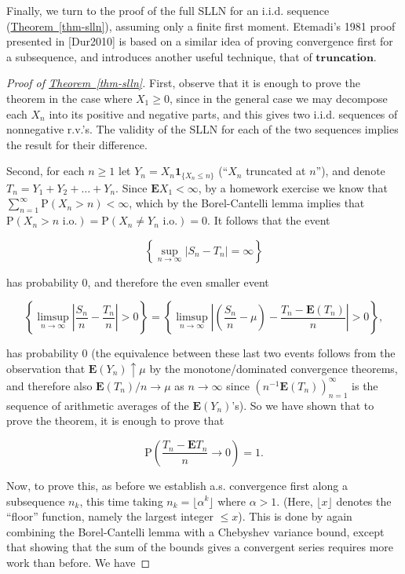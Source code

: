 \documentclass[11pt]{report}
\theoremstyle{plain}
\theoremstyle{definition}
\begin{document}
\noindent Finally, we turn to the proof of the full SLLN for an
i.i.d. sequence (\hyperref[thm-slln]{Theorem~\ref*{thm-slln}}), assuming only a
finite first moment. Etemadi's 1981 proof presented in
[Dur2010] is based on a similar idea of proving
convergence first for a subsequence, and introduces
another useful technique, that of
$\textbf{truncation}$.

\begin{proof}[Proof of \texorpdfstring{\hyperref[thm-slln]{Theorem~\ref*{thm-slln}}}{Theorem}]
First, observe that it is enough to prove the theorem
in the case where $X_1\ge 0$, since in the general
case we may decompose each $X_n$ into its positive
and negative parts, and this gives two i.i.d.
sequences of nonnegative r.v.'s. The validity of the
SLLN for each of the two sequences implies the result
for their difference.

Second, for each $n\ge 1$ let
$Y_n = X_n \mathbf{1}_{\{X_n\le n\}}$ (``$X_n$
truncated at $n$''), and denote
$T_n=Y_1+Y_2+\ldots +Y_n$. Since
$\mathbf{E} X_1<\infty$, by a homework exercise we
know that
$\sum_{n=1}^\infty \mathrm{P}(X_n> n)<\infty$, which
by the Borel-Cantelli lemma implies that
$\mathrm{P}(X_n>n\textrm{ i.o.}) = \mathrm{P}(X_n\neq
Y_n\textrm{ i.o.}) = 0$.
It follows that the event

\[
\left\{ \sup_{n\to\infty} |S_n-T_n|=\infty \right\}
\]

\noindent has probability 0, and therefore the even smaller
event

\[
\left\{ \limsup_{n\to\infty} \left|\frac{S_n}{n}-\frac{T_n}{n} \right|>0 \right\}=
\left\{ \limsup_{n\to\infty} \left|\left(\frac{S_n}{n}-\mu\right)-\frac{T_n-\mathbf{E}(T_n)}{n} \right|>0 \right\},
\]

\noindent has probability 0 (the equivalence between these last
two events follows from the observation that
$\mathbf{E}(Y_n)\uparrow \mu$ by the
monotone/dominated convergence theorems, and therefore
also $\mathbf{E}(T_n)/n\to\mu$ as $n\to\infty$ since
$(n^{-1} \mathbf{E}(T_n))_{n=1}^\infty$ is the
sequence of arithmetic averages of the
$\mathbf{E}(Y_n)$'s). So we have shown that to prove
the theorem, it is enough to prove that

\[
\mathrm{P}\left(\frac{T_n-\mathbf{E} T_n}{n}\to0\right) = 1.
\]

\noindent Now, to prove this, as before we establish a.s.
convergence first along a subsequence $n_k$, this
time taking $n_k = \lfloor \alpha^k \rfloor$ where
$\alpha>1$. (Here, $\lfloor x\rfloor$ denotes the
``floor'' function, namely the largest integer
$\le x$). This is done by again combining the
Borel-Cantelli lemma with a Chebyshev variance bound,
except that showing that the sum of the bounds gives a
convergent series requires more work than before. We
have


\end{proof}
\end{document}
